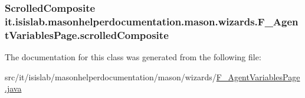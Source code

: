 \hypertarget{classit_1_1isislab_1_1masonhelperdocumentation_1_1mason_1_1wizards_1_1_f___agent_variables_page_a95b20ea3356cda7bd73e9507e43859eb}{
\subsubsection[{scrolled\-Composite}]{\setlength{\rightskip}{0pt plus 5cm}Scrolled\-Composite it.\-isislab.\-masonhelperdocumentation.\-mason.\-wizards.\-F\-\_\-\-Agent\-Variables\-Page.\-scrolled\-Composite\hspace{0.3cm}{\ttfamily [private]}}}\label{classit_1_1isislab_1_1masonhelperdocumentation_1_1mason_1_1wizards_1_1_f___agent_variables_page_a95b20ea3356cda7bd73e9507e43859eb}


The documentation for this class was generated from the following file\-:\begin{DoxyCompactItemize}
\item 
src/it/isislab/masonhelperdocumentation/mason/wizards/\hyperlink{_f___agent_variables_page_8java}{F\-\_\-\-Agent\-Variables\-Page.\-java}\end{DoxyCompactItemize}
